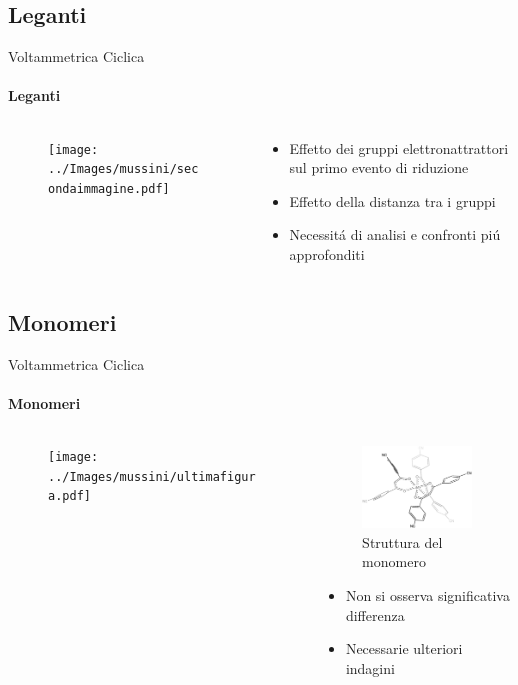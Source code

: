 \documentclass[aspectration=169]{beamer}
\begin{document}
\subsection{Leganti}
\begin{frame}{Voltammetrica Ciclica}
	\centering
	\framesubtitle{Leganti}
	\begin{columns}
		\begin{column}{0.5\textwidth}
			\begin{figure}[h!]
				\vspace*{-0.5cm}
				\centering
				\texttt{[image: ../Images/mussini/secondaimmagine.pdf]}
			\end{figure}
		\end{column}
		\begin{column}{0.5\textwidth}
			\vspace*{-0.5cm}
			\begin{itemize}
				\item Effetto dei gruppi elettronattrattori sul primo evento di riduzione
				\item Effetto della distanza tra i gruppi
				\item Necessitá di analisi e confronti piú approfonditi
			\end{itemize}
		\end{column}
	\end{columns}
\end{frame}

\subsection{Monomeri}
\begin{frame}{Voltammetrica Ciclica}
	\framesubtitle{Monomeri}
	\begin{columns}
		\hspace{1cm}
		\begin{column}{0.5\textwidth}
			\begin{figure}[h!]
				\centering
				\texttt{[image: ../Images/mussini/ultimafigura.pdf]}
			\end{figure}
		\end{column}
		\begin{column}{0.5\textwidth}
			\begin{figure}[h!]
				\centering
				\includegraphics[width=3cm,keepaspectratio]{../Structures/monomero.eps}
				\caption{Struttura del monomero}
			\end{figure}
			\begin{itemize}
				\item Non si osserva significativa differenza
				\item Necessarie ulteriori indagini
			\end{itemize}
		\end{column}
	\end{columns}
	\vspace{0.5cm}
	\centering
\end{frame}
\end{document}
